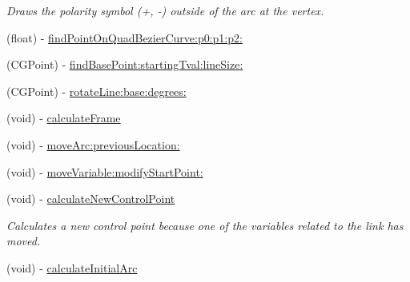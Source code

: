 \begin{DoxyCompactItemize}
\begin{DoxyCompactList}\small\item\em Draws the polarity symbol (+, -\/) outside of the arc at the vertex. \end{DoxyCompactList}\item 
(float) -\/ \hyperlink{interface_causal_link_view_a12afbc746363f523651de2767d2487b2}{find\-Point\-On\-Quad\-Bezier\-Curve\-:p0\-:p1\-:p2\-:}
\item 
(C\-G\-Point) -\/ \hyperlink{interface_causal_link_view_a0493957fa8e8d0ec4f70d9b10321a604}{find\-Base\-Point\-:starting\-Tval\-:line\-Size\-:}
\item 
(C\-G\-Point) -\/ \hyperlink{interface_causal_link_view_a910e5f8e9cfba7c8881bf5555984996b}{rotate\-Line\-:base\-:degrees\-:}
\item 
(void) -\/ \hyperlink{interface_causal_link_view_a16ce7ec5c4dff09ffb1cfb9306977fc2}{calculate\-Frame}
\item 
(void) -\/ \hyperlink{interface_causal_link_view_afcd8e0f9b511eafba30829975f38f8b7}{move\-Arc\-:previous\-Location\-:}
\item 
(void) -\/ \hyperlink{interface_causal_link_view_a5ff220a0a810bec7f0eb1265fa10df73}{move\-Variable\-:modify\-Start\-Point\-:}
\item 
\hypertarget{interface_causal_link_view_a5e9eaa469086723dfe009fa52542ecd0}{(void) -\/ \hyperlink{interface_causal_link_view_a5e9eaa469086723dfe009fa52542ecd0}{calculate\-New\-Control\-Point}}\label{interface_causal_link_view_a5e9eaa469086723dfe009fa52542ecd0}

\begin{DoxyCompactList}\small\item\em Calculates a new control point because one of the variables related to the link has moved. \end{DoxyCompactList}\item 
\hypertarget{interface_causal_link_view_a1998df670fd8f6c2f22575522a4eab8a}{(void) -\/ \hyperlink{interface_causal_link_view_a1998df670fd8f6c2f22575522a4eab8a}{calculate\-Initial\-Arc}}\label{interface_causal_link_view_a1998df670fd8f6c2f22575522a4eab8a}


\end{DoxyCompactItemize}
